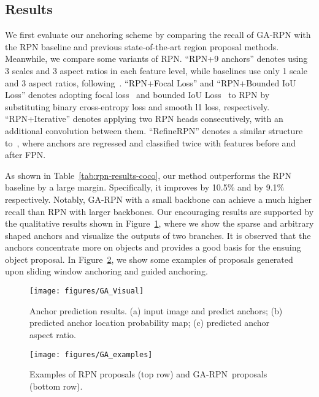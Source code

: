 \documentclass[10pt,twocolumn,letterpaper]{article}
\newcommand{\algname}{GA-RPN}
\begin{document}
\subsection{Results}

We first evaluate our anchoring scheme by comparing the recall of GA-RPN
with the RPN baseline and previous state-of-the-art region proposal methods.
Meanwhile, we compare some variants of RPN.
``RPN+9 anchors'' denotes using 3 scales and 3 aspect ratios in each feature level,
while baselines use only 1 scale and 3 aspect ratios, following~\cite{lin2017feature}.
``RPN+Focal Loss'' and ``RPN+Bounded IoU Loss'' denotes adopting focal loss~\cite{lin2017focal} 
and bounded IoU Loss~\cite{tychsen2018improving} to RPN by substituting binary cross-entropy loss and smooth l1 loss, respectively.
``RPN+Iterative'' denotes applying two RPN heads consecutively,
with an additional  convolution between them.
``RefineRPN'' denotes a similar structure to~\cite{zhang2017single},
where anchors are regressed and classified twice with features before and after FPN.

As shown in Table~\ref{tab:rpn-results-coco}, our method outperforms the RPN baseline by a large margin.
Specifically, it improves  by 10.5\% and  by
9.1\% respectively.
Notably, GA-RPN with a small backbone can achieve a much higher recall than
RPN with larger backbones.
Our encouraging results are supported by the qualitative results shown in
Figure~\ref{fig:visualization}, where we show the sparse and arbitrary shaped
anchors and visualize the outputs of two branches.
It is observed that the anchors concentrate more on objects and provides
a good basis for the ensuing object proposal.
In Figure~\ref{fig:examples}, we show some examples of proposals generated upon
sliding window anchoring and guided anchoring.

\begin{figure}[t]
	\centering
	\texttt{[image: figures/GA\_Visual]}
	\vskip -0.25cm
	\caption{\small{Anchor prediction results. (a) input image and predict anchors;
		(b) predicted anchor location probability map; (c) predicted anchor aspect ratio.}}
	\label{fig:visualization}
	\vspace{-5pt}
\end{figure}

\begin{figure}[t]
	\centering
	\texttt{[image: figures/GA\_examples]}
	\caption{\small{Examples of RPN proposals (top row) and \algname~proposals (bottom row).}}
	\label{fig:examples}
	\vspace{-10pt}
\end{figure}
\end{document}

